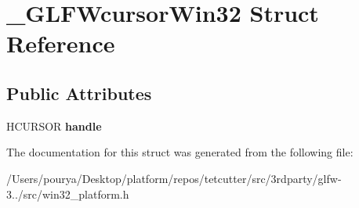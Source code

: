 \hypertarget{struct__GLFWcursorWin32}{}\section{\+\_\+\+G\+L\+F\+Wcursor\+Win32 Struct Reference}
\label{struct__GLFWcursorWin32}
\subsection*{Public Attributes}
\begin{DoxyCompactItemize}
\item 
\hypertarget{struct__GLFWcursorWin32_a05b1322d7792b717f9fd46a89c49aa14}{}H\+C\+U\+R\+S\+O\+R {\bfseries handle}\label{struct__GLFWcursorWin32_a05b1322d7792b717f9fd46a89c49aa14}

\end{DoxyCompactItemize}


The documentation for this struct was generated from the following file\+:\begin{DoxyCompactItemize}
\item 
/\+Users/pourya/\+Desktop/platform/repos/tetcutter/src/3rdparty/glfw-\/3../src/win32\+\_\+platform.\+h\end{DoxyCompactItemize}
